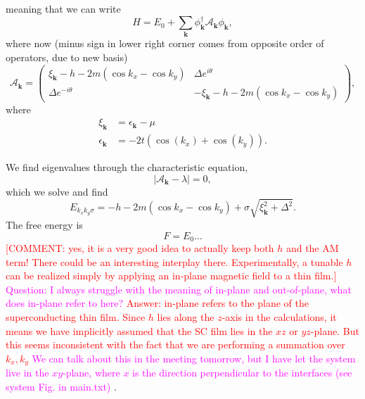 \documentclass[aps,onecolumn,amsmath,amssymb,preprintnumbers,floatfix,prl,superscriptaddress,longbibliography]{revtex4-2}%
\newcommand{\hans}[1]{\textcolor{Magenta}{{#1}}}
\newcommand{\jacob}[1]{\textcolor{Red}{{#1}}}
\renewcommand\vec{\mathbf}
\begin{document}
meaning that we can write
\begin{equation}
    H = E_0 + \sum_{\vec k} \phi_\vec{k}^\dag \mathcal A_\vec{k} \phi_\vec{k},
\end{equation}
where now (minus sign in lower right corner comes from opposite order of operators, due to new basis)
\begin{equation}
    \mathcal A_\vec{k}
    =
    \begin{pmatrix}
        \xi_\vec{k}   - h  - 2m (\cos{k_x} - \cos{k_y})& \Delta e^{i \theta}
        \\
        \Delta e^{-i \theta} & -\xi_\vec{k} - h  - 2m (\cos{k_x} - \cos{k_y})
    \end{pmatrix},
\end{equation}
where 
\begin{align}
    \xi_\vec{k} &= \epsilon_\vec{k} - \mu\\
    \epsilon_{\vec k} &= -  2t( \cos(k_x) + \cos(k_y)).
\end{align}

We find eigenvalues through the characteristic equation,
\begin{equation}
    |\mathcal A_\vec{k} - \lambda| = 0,
\end{equation}
which we solve and find
\begin{equation}
    E_{k_x k_y \sigma} = - h  - 2m (\cos{k_x} - \cos{k_y}) + \sigma \sqrt{\xi_\vec{k}^2 + \Delta^2}.
\end{equation}
The free energy is 
\begin{equation}
    F = E_0 \ldots
\end{equation}
\jacob{[COMMENT: yes, it is a very good idea to actually keep both $h$ and the AM term! There could be an interesting interplay there. Experimentally, a tunable $h$ can be realized simply by applying an in-plane magnetic field to a thin film.]}
\hans{Question: I always struggle with the meaning of in-plane and out-of-plane, what does in-plane refer to here?} \jacob{Answer: in-plane refers to the plane of the superconducting thin film. Since $h$ lies along the $z$-axis in the calculations, it means we have implicitly assumed that the SC film lies in the $xz$ or $yz$-plane. But this seems inconsistent with the fact that we are performing a summation over $k_x,k_y$}
\hans{We can talk about this in the meeting tomorrow, but I have let the system live in the $xy$-plane, where $x$ is the direction perpendicular to the interfaces (see system Fig. in main.txt) }.
\end{document}
